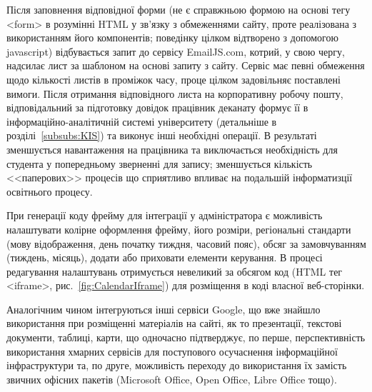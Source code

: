 
Після заповнення відповідної форми (не є справжньою формою на основі тегу <form> в розумінні HTML у зв'язку з обмеженнями сайту, проте реалізована з використанням його компонентів; поведінку цілком відтворено з допомогою javascript) відбувається запит до сервісу EmailJS.com, котрий, у свою чергу, надсилає лист за шаблоном на основі запиту з сайту. Сервіс має певні обмеження щодо кількості листів в проміжок часу, проце цілком задовільняє поставлені вимоги. Після отримання відповідного листа на корпоративну робочу пошту, відповідальний за підготовку довідок працівник деканату формує її в інформаційно-аналітичній системі університету  (детальніше в розділі~\ref{subsubs:KIS}) та виконує інші необхідні операції. В результаті зменшується навантаження на працівника та виключається необхідність  для студента у попередньому зверненні для запису; зменшується кількість <<паперових>> процесів що сприятливо впливає на подальшій інформатизції освітнього процесу.

При генерації коду фрейму для інтеграції у адміністратора є можливість налаштувати колірне оформлення фрейму, його розміри, регіональні стандарти (мову відображення, день початку тиждня, часовий пояс), обсяг за замовчуванням (тиждень, місяць), додати або приховати елементи керування. В процесі редагування налаштувань отримується невеликий за обсягом код (HTML тег <iframe>, рис.~\ref{fig:CalendarIframe}) для розміщення в коді власної веб-сторінки. 


Аналогічним чином інтегруються інші сервіси Google, що вже знайшло використання при розміщенні матеріалів на сайті, як то презентації, текстові документи, таблиці, карти, що одночасно підтверджує, по перше, перспективність використання хмарних сервісів для поступового осучаснення інформаційної інфраструктури та, по друге, можливість переходу до використання їх замість звичних офісних пакетів (Microsoft Office, Open Office, Libre Office тощо).

